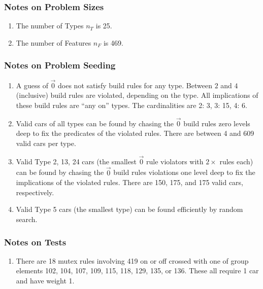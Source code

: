 \documentclass[aps,prl,twocolumn,superscriptaddress,groupedaddress]{revtex4}  %
\begin{document}
\subsubsection{Notes on Problem Sizes}

\begin{enumerate}
\item The number of Types $n_{T}$ is 25.
\item The number of Features $n_{F}$ is 469. 
\end{enumerate}

\subsubsection{Notes on Problem Seeding}

\begin{enumerate}
\item A guess of $\vec 0$ does not satisfy build rules for any type. Between $2$
and $4$ (inclusive) build rules are violated, depending on the type. All
implications of these build rules are ``any on'' types. The cardinalities are 2:
3, 3: 15, 4: 6.
\item Valid cars of all types can be found by chasing the $\vec 0$ build rules
zero levels deep to fix the predicates of the violated rules. There are between
4 and 609 valid cars per type.
\item Valid Type 2, 13, 24 cars (the smallest $\vec 0$ rule violators with
$2\times$ rules each) can be found by chasing the $\vec 0$ build rules
violations one level deep to fix the implications of the violated rules. There
are 150, 175, and 175 valid cars, respectively.
\item Valid Type 5 cars (the smallest type) can be found efficiently by random
search.
\end{enumerate}

\subsubsection{Notes on Tests}

\begin{enumerate}
\item There are 18 mutex rules involving 419 on or off crossed with one of group
elements 102, 104, 107, 109, 115, 118, 129, 135, or 136. These all require 1 car
and have weight 1.
\end{enumerate}

% 
% 
\end{document}
